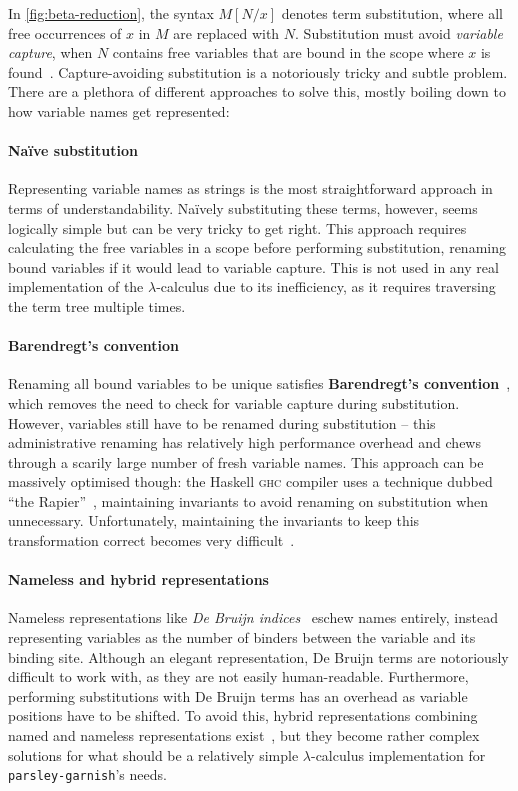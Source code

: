 \documentclass[../../main.tex]{subfiles}
\begin{document}
In \cref{fig:beta-reduction}, the syntax $M[N/x]$ denotes term substitution, where all free occurrences of $x$ in $M$ are replaced with $N$.
Substitution must avoid \emph{variable capture}, when $N$ contains free variables that are bound in the scope where $x$ is found~\cite{van-bakel_tsfpl_2022}.
Capture-avoiding substitution is a notoriously tricky and subtle problem.
There are a plethora of different approaches to solve this, mostly boiling down to how variable names get represented:

\paragraph{Naïve substitution}
Representing variable names as strings is the most straightforward approach in terms of understandability.
Naïvely substituting these terms, however, seems logically simple but can be very tricky to get right.
This approach requires calculating the free variables in a scope before performing substitution, renaming bound variables if it would lead to variable capture.
This is not used in any real implementation of the $\lambda$-calculus due to its inefficiency, as it requires traversing the term tree multiple times.

\paragraph{Barendregt's convention}
Renaming all bound variables to be unique satisfies \textbf{Barendregt's convention}~\cite{barendregt_lambda_1984}, which removes the need to check for variable capture during substitution.
However, variables still have to be renamed during substitution -- this administrative renaming has relatively high performance overhead and chews through a scarily large number of fresh variable names.
This approach can be massively optimised though: the Haskell \textsc{ghc} compiler uses a technique dubbed ``the Rapier''~\cite{peytonjones_secrets_2002}, maintaining invariants to avoid renaming on substitution when unnecessary.
Unfortunately, maintaining the invariants to keep this transformation correct becomes very difficult~\cite{maclaurin_thefoil_2023}.

\paragraph{Nameless and hybrid representations}
Nameless representations like \emph{De Bruijn indices}~\cite{debruijn_lambda_1972} eschew names entirely, instead representing variables as the number of binders between the variable and its binding site.
Although an elegant representation, De Bruijn terms are notoriously difficult to work with, as they are not easily human-readable.
Furthermore, performing substitutions with De Bruijn terms has an overhead as variable positions have to be shifted.
To avoid this, hybrid representations combining named and nameless representations exist~\cite{mcbride_imnotanumber_2004,chargueraud_locally_2012}, but they become rather complex solutions for what should be a relatively simple $\lambda$-calculus implementation for \texttt{parsley-garnish}'s needs.
\end{document}
